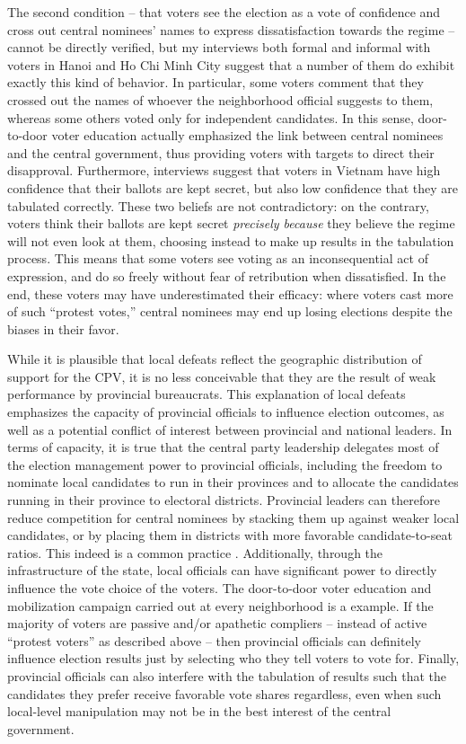 \documentclass[12pt]{article}\usepackage[]{graphicx}\usepackage[]{color}
\newcommand{\1}{\mathbbm{1}}
\begin{document}
The second condition -- that voters see the election as a vote of confidence and cross out central nominees' names to express dissatisfaction towards the regime -- cannot be directly verified, but my interviews both formal and informal with voters in Hanoi and Ho Chi Minh City suggest that a number of them do exhibit exactly this kind of behavior. In particular, some voters comment that they crossed out the names of whoever the neighborhood official suggests to them, whereas some others voted only for independent candidates. In this sense, door-to-door voter education actually emphasized the link between central nominees and the central government, thus providing voters with targets to direct their disapproval. Furthermore, interviews suggest that voters in Vietnam have high confidence that their ballots are kept secret, but also low confidence that they are tabulated correctly. These two beliefs are not contradictory: on the contrary, voters think their ballots are kept secret \textit{precisely because} they believe the regime will not even look at them, choosing instead to make up results in the tabulation process. This means that some voters see voting as an inconsequential act of expression, and do so freely without fear of retribution when dissatisfied. In the end, these voters may have underestimated their efficacy: where voters cast more of such ``protest votes,'' central nominees may end up losing elections despite the biases in their favor.

While it is plausible that local defeats reflect the geographic distribution of support for the CPV, it is no less conceivable that they are the result of weak performance by provincial bureaucrats. This explanation of local defeats emphasizes the capacity of provincial officials to influence election outcomes, as well as a potential conflict of interest between provincial and national leaders. In terms of capacity, it is true that the central party leadership delegates most of the election management power to provincial officials, including the freedom to nominate local candidates to run in their provinces and to allocate the candidates running in their province to electoral districts. Provincial leaders can therefore reduce competition for central nominees by stacking them up against weaker local candidates, or by placing them in districts with more favorable candidate-to-seat ratios. This indeed is a common practice \cite[provided confirmatory evidence for the 2007 election, which I replicated successfully for the 2011 and 2016 elections]{MaleskySchuler2011}.  Additionally, through the infrastructure of the state, local officials can have significant power to directly influence the vote choice of the voters. The door-to-door voter education and mobilization campaign carried out at every neighborhood is a example. If the majority of voters are passive and/or apathetic compliers -- instead of active ``protest voters'' as described above -- then provincial officials can definitely influence election results just by selecting who they tell voters to vote for. Finally, provincial officials can also interfere with the tabulation of results such that the candidates they prefer receive favorable vote shares regardless, even when such local-level manipulation may not be in the best interest of the central government. 
\end{document}
